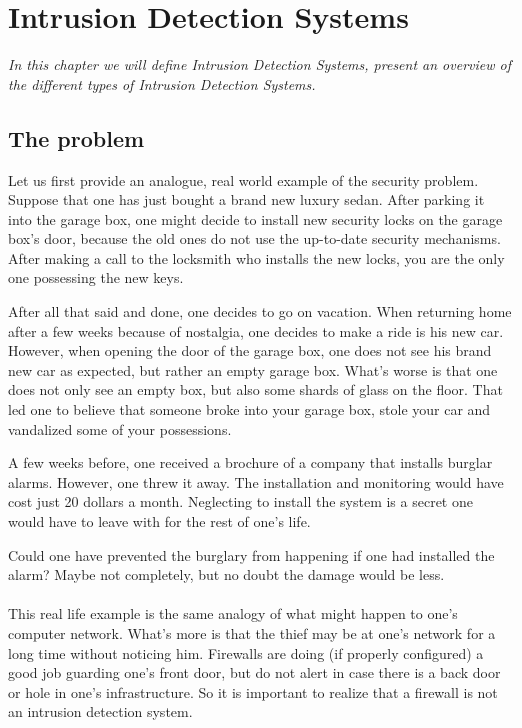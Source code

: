 \chapter{Intrusion Detection Systems}
\minitoc
\emph{In \label{chap:IDS} this chapter we will define Intrusion Detection Systems, present an overview of the different types of Intrusion Detection Systems.}

\section{The problem}

Let us first provide an analogue, real world example of the security problem. Suppose that one has just bought a brand new luxury sedan. After parking it into the garage box, one might decide to install new security locks on the garage box's door, because the old ones do not use the up-to-date security mechanisms. After making a call to the locksmith who installs the new locks, you are the only one possessing the new keys.

After all that said and done, one decides to go on vacation. When returning home after a few weeks because of nostalgia, one decides to make a ride is his new car. However, when opening the door of the garage box, one does not see his brand new car as expected, but rather an empty garage box. What's worse is that one does not only see an empty box, but also some shards of glass on the floor. That led one to believe that someone broke into your garage box, stole your car and vandalized some of your possessions.

A few weeks before, one received a brochure of a company that installs burglar alarms. However, one threw it away. The installation and monitoring would have cost just 20 dollars a month. Neglecting to install the system is a secret one would have to leave with for the rest of one's life.

Could one have prevented the burglary from happening if one had installed the alarm?  Maybe not completely, but no doubt the damage would be less. \\ \\
This real life example is the same analogy of what might happen to one's computer network. What's more is that the thief may be at one's network for a long time without noticing him. Firewalls are doing (if properly configured) a good job guarding one's front door, but do not alert in case there is a back door or hole in one's infrastructure. So it is important to realize that a firewall is not an intrusion detection system.

